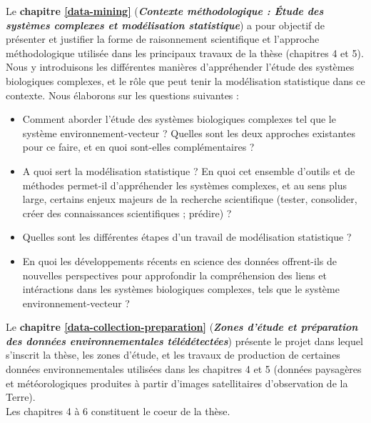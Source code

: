 \documentclass[12pt,twoside]{reedthesis}
\providecommand{\tightlist}{%
  \setlength{\itemsep}{0pt}\setlength{\parskip}{0pt}}
\begin{document}
Le \textbf{chapitre \ref{data-mining}} (\textbf{\emph{Contexte méthodologique : Étude des systèmes complexes et modélisation statistique}}) a pour objectif de présenter et justifier la forme de raisonnement scientifique et l'approche méthodologique utilisée dans les principaux travaux de la thèse (chapitres 4 et 5). Nous y introduisons les différentes manières d'appréhender l'étude des systèmes biologiques complexes, et le rôle que peut tenir la modélisation statistique dans ce contexte. Nous élaborons sur les questions suivantes :
\begin{itemize}
\tightlist
\item
  Comment aborder l'étude des systèmes biologiques complexes tel que le système environnement-vecteur ? Quelles sont les deux approches existantes pour ce faire, et en quoi sont-elles complémentaires ?
\item
  A quoi sert la modélisation statistique ? En quoi cet ensemble d'outils et de méthodes permet-il d'appréhender les systèmes complexes, et au sens plus large, certains enjeux majeurs de la recherche scientifique (tester, consolider, créer des connaissances scientifiques ; prédire) ?
\item
  Quelles sont les différentes étapes d'un travail de modélisation statistique ?
\item
  En quoi les développements récents en science des données offrent-ils de nouvelles perspectives pour approfondir la compréhension des liens et intéractions dans les systèmes biologiques complexes, tels que le système environnement-vecteur ?\\
\end{itemize}
Le \textbf{chapitre \ref{data-collection-preparation}} (\textbf{\emph{Zones d'étude et préparation des données environnementales télédétectées}}) présente le projet dans lequel s'inscrit la thèse, les zones d'étude, et les travaux de production de certaines données environnementales utilisées dans les chapitres 4 et 5 (données paysagères et météorologiques produites à partir d'images satellitaires d'observation de la Terre).\\

Les chapitres 4 à 6 constituent le coeur de la thèse.\\
\end{document}
